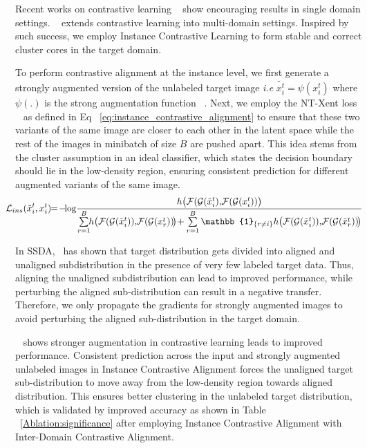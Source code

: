 Recent works on contrastive learning ~\cite{He2020MomentumCF,Oord2018RepresentationLW,Chen2020ASF} show encouraging results in single domain settings. ~\cite{Kim2020CrossdomainSL} extends contrastive learning into multi-domain settings. Inspired by such success, we employ Instance Contrastive Learning to form stable and correct cluster cores in the target domain.

To perform contrastive alignment at the instance level, we first generate a strongly augmented version of the unlabeled target image \textit{i.e} $\tilde{x_i^t}= \psi(x_i^t)$ where $\psi(.)$ is the strong augmentation function ~\cite{Cubuk2020RandaugmentPA}. Next, we employ the NT-Xent loss ~\cite{Chen2020ASF, Oord2018RepresentationLW}  as defined in Eq ~\eqref{eq:instance_contrastive_alignment}  to ensure that these two variants of the same image are closer to each other in the latent space while the rest of the images in minibatch of size $B$ are pushed apart. This idea stems from the cluster assumption in an ideal classifier, which states the decision boundary should lie in the low-density region, ensuring consistent prediction for different augmented variants of the same image.
\vspace{2mm}
\begin{equation}
\label{eq:instance_contrastive_alignment}
\hspace{-4mm}
\mathcal{L}_{ins}(\tilde{x}_i^t, x_i^t)\!\!=
\!-\!\!\log\!\frac{h\big(\mathcal{F}(\mathcal{G}(\tilde{x}_i^t), \!\mathcal{F}(\mathcal{G}(x_i^t))\big)}{\sum\limits_{\substack{r=1}}^{B}\!\!h\big(\mathcal{F}(\mathcal{G}(
\tilde{x}_i^t)),\!\mathcal{F}(\mathcal{G}(x_r^t))\!\big)\!+\sum\limits_{\substack{r=1}}^{B}\mathbb{1}_{\{r
\neq i\}}h\big(\mathcal{F}(\mathcal{G}(\tilde{x}_i^t)),\!\mathcal{F}(\mathcal{G}(\tilde{x}_r^t))\!\big)}
\end{equation}
\vspace{2mm}

In SSDA,~\cite{Kim2020AttractPA} has shown that target distribution gets divided into aligned and unaligned subdistribution in the presence of very few labeled target data. Thus, aligning the unaligned subdistribution can lead to improved performance, while perturbing the aligned sub-distribution can result in a negative transfer. Therefore, we only propagate the gradients for strongly augmented images to avoid perturbing the aligned sub-distribution in the target domain.

~\cite{Chen2020ASF} shows stronger augmentation in contrastive learning leads to improved performance. Consistent prediction across the input and strongly augmented unlabeled images in Instance Contrastive Alignment forces the unaligned target sub-distribution to move away from the low-density region towards aligned distribution.  This ensures better clustering in the unlabeled target distribution, which is validated by improved accuracy as shown in Table ~\ref{Ablation:significance} after employing Instance Contrastive Alignment with Inter-Domain Contrastive Alignment.

